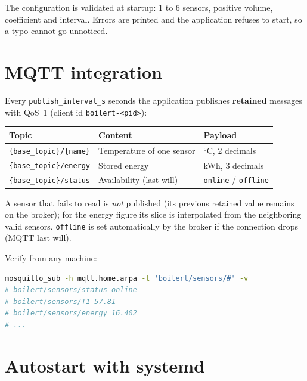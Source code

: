 \documentclass[11pt,a4paper,parskip=half]{scrartcl}
\newcommand{\code}[1]{\texttt{#1}}
\begin{document}
The configuration is validated at startup: 1 to 6 sensors, positive volume,
coefficient and interval. Errors are printed and the application refuses to
start, so a typo cannot go unnoticed.

\section{MQTT integration}

Every \code{publish\_interval\_s} seconds the application publishes
\textbf{retained} messages with QoS~1 (client id \code{boilert-<pid>}):

\begin{center}
\begin{tabularx}{\textwidth}{@{}lXl@{}}
\toprule
\textbf{Topic} & \textbf{Content} & \textbf{Payload}\\
\midrule
\code{\{base\_topic\}/\{name\}} & Temperature of one sensor & °C, 2 decimals\\
\code{\{base\_topic\}/energy} & Stored energy & kWh, 3 decimals\\
\code{\{base\_topic\}/status} & Availability (last will) & \code{online} / \code{offline}\\
\bottomrule
\end{tabularx}
\end{center}

A sensor that fails to read is \emph{not} published (its previous retained
value remains on the broker); for the energy figure its slice is
interpolated from the neighboring valid sensors. \code{offline} is set
automatically by the broker if the connection drops (MQTT last will).

Verify from any machine:

\begin{lstlisting}[language=bash]
mosquitto_sub -h mqtt.home.arpa -t 'boilert/sensors/#' -v
# boilert/sensors/status online
# boilert/sensors/T1 57.81
# boilert/sensors/energy 16.402
# ...
\end{lstlisting}

\section{Autostart with systemd}
\end{document}
